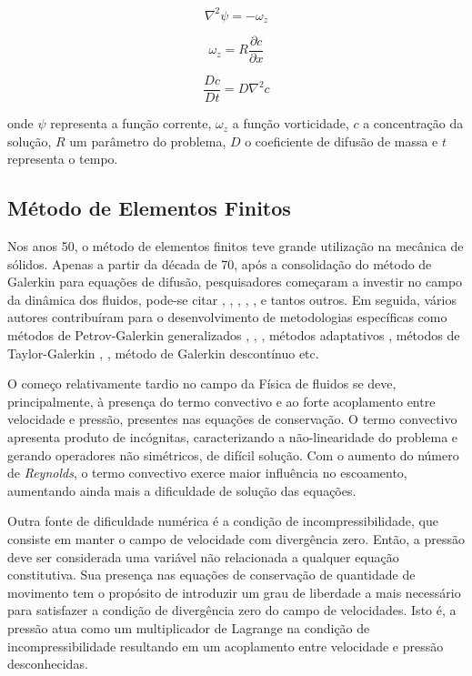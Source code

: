 \documentclass[a4paper,portuges,12pt]{article}
\begin{document}
\begin{equation}
	\nabla^2 \psi = -\omega_z
\label{eq:chem1}
\end{equation}

\begin{equation}
	\omega_z = R \frac{\partial c}{\partial x}
\label{eq:chem2}
\end{equation}

\begin{equation}
	\frac{D c}{D t} = D \nabla^2 c
\label{eq:chem3}
\end{equation}\vspace{0.5cm}

\noindent onde $\psi$ representa a função corrente, $\omega_z$ a função
vorticidade, $c$ a concentração da solução, $R$ um parâmetro do
problema, $D$ o coeficiente de difusão de massa e $t$ representa o
tempo.

\subsection{Método de Elementos Finitos}

Nos anos 50, o método de elementos finitos teve grande utilização na
mecânica de sólidos.  Apenas a partir da década de 70, após a
consolidação do método de Galerkin para equações de difusão,
pesquisadores começaram a investir no campo da dinâmica dos fluidos,
pode-se citar \cite{zienkiewicz1965}, \cite{oden1972}, \cite{oden1998},
\cite{chung1978}, \cite{hughes1982}, \cite{pironneau1989} e tantos
outros.  Em seguida, vários autores contribuíram para o desenvolvimento
de metodologias específicas como métodos de Petrov-Galerkin
generalizados \cite{heinrich1977}, \cite{hughes1986},
\cite{johnson1987}, métodos adaptativos \cite{oden1989}, métodos de
Taylor-Galerkin \cite{donea1984}, \cite{lohner1985}, método de Galerkin
descontínuo \cite{oden1998} etc.

O começo relativamente tardio no campo da Física de fluidos se deve,
principalmente, à presença do termo convectivo e ao forte acoplamento
entre velocidade e pressão, presentes nas equações de conservação. O
termo convectivo apresenta produto de incógnitas, caracterizando a
não-linearidade do problema e gerando operadores não simétricos, de
difícil solução.  Com o aumento do número de \emph{Reynolds}, o termo
convectivo exerce maior influência no escoamento, aumentando ainda mais
a dificuldade de solução das equações.

Outra fonte de dificuldade numérica é a condição de incompressibilidade,
que consiste em manter o campo de velocidade com divergência zero.
Então, a pressão deve ser considerada uma variável não relacionada a
qualquer equação constitutiva.  Sua presença nas equações de conservação
de quantidade de movimento tem o propósito de introduzir um grau de
liberdade a mais necessário para satisfazer a condição de divergência
zero do campo de velocidades.  Isto é, a pressão atua como um
multiplicador de Lagrange na condição de incompressibilidade resultando
em um acoplamento entre velocidade e pressão desconhecidas.
\end{document}
